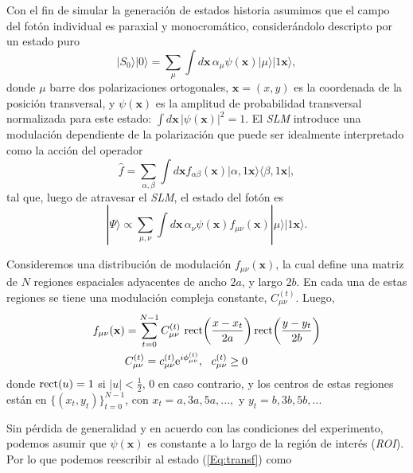 Con el fin de simular la generación de estados historia asumimos que el campo del fotón individual es paraxial y monocromático, considerándolo descripto por un estado puro
\begin{equation}
|S_0\rangle|0\rangle=\sum_{\mu}\int\!d\mathbf{x}\,\alpha_\mu\psi(\mathbf{x})|\mu\rangle|1\mathbf{x}\rangle,
\end{equation}
donde $\mu$
barre dos polarizaciones ortogonales, $\mathbf{x}=(x,y)$ 
es la coordenada de la posición transversal, y $\psi(\mathbf{x})$ 
es la amplitud de probabilidad transversal normalizada 
para este estado:  $\int\!d\mathbf{x}\,|\psi(\mathbf{x})|^2=1$. 
El {\it SLM} introduce
una modulación dependiente de la polarización que 
puede ser idealmente interpretado como la acción del operador
\begin{equation}
    \hat{f}=\sum_{\alpha, \beta}\int d\mathbf{x}f_{\alpha \beta}(\mathbf{x})|\alpha,1 \mathbf{x}\rangle\langle\beta, 1\mathbf{x}|,
\end{equation}
tal que, luego de atravesar el {\it SLM},
el estado del fotón es
\begin{equation}
|\Psi\rangle\propto\sum_{\mu,\nu}\label{Eq:transf} \int\!d\mathbf{x}\,\alpha_\nu\psi(\mathbf{x})f_{\mu\nu}(\mathbf{x})|\mu\rangle|1\mathbf{x}\rangle.
\end{equation}

Consideremos una distribución de modulación $f_{\mu\nu}(\mathbf{x})$,
la cual define una matriz de $N$ regiones espaciales adyacentes de ancho $2a$, 
y largo $2b$. En cada una de estas regiones se tiene una modulación compleja constante, $C_{\mu\nu}^{(t)}$. Luego,
\begin{equation} \label{eq:fNregions}
\begin{split}    
f_{\mu\nu}(\mathbf{x})&= \sum_{t=0}^{N-1}C_{\mu\nu}^{(t)}~{\rm
rect}\!\left(\frac{x-x_t}{2a}\right){\rm
rect}\!\left(\frac{y-y_t}{2b}\right)\\
&C_{\mu\nu}^{(t)}=c_{\mu\nu}^{(t)}{\rm e}^{i\phi^{(t)}_{\mu\nu}},~~c_{\mu\nu}^{(t)}\geq0
\end{split}
\end{equation}
donde ${\rm
rect}\!\left(u\right)=1$ si $|u| < \frac{1}{2}$, 0 en caso contrario, y 
los centros de estas regiones están en $\{(x_t,y_t)\}_{t=0}^{N-1}$, con $x_t=a, 3a,5a,...,$ y $y_t=b, 3b, 5b,...$ 

Sin pérdida de generalidad y en acuerdo con las condiciones del experimento, podemos
asumir que  $\psi(\mathbf{x})$ es constante 
a lo largo de la región de interés ({\it ROI}). Por lo que podemos reescribir al estado (\ref{Eq:transf}) como

